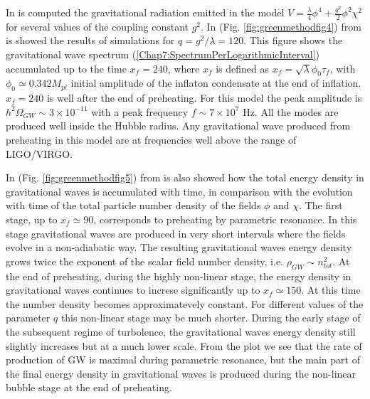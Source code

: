 \documentclass[11pt,a4paper,twoside]{book}
\begin{document}
In \cite{Chap7:GreenMethod} is computed the gravitational radiation emitted in the model $ V=\frac{\lambda}{4}\phi^{4}+\frac{g^{2}}{2}\phi^{2}\chi^{2} $ for several values of the coupling constant $ g^{2} $. In (Fig. \ref{fig:greenmethodfig4}) from \cite{Chap7:GreenMethod} is showed the results of simulations for $ q=g^{2}/\lambda=120 $. This figure shows the gravitational wave spectrum (\ref{Chap7:SpectrumPerLogarithmicInterval}) accumulated up to the time $ x_{f}= 240 $, where $ x_{f} $ is defined as $ x_{f}=\sqrt{\lambda}\phi_{0}\tau_{f} $, with $\phi_{0} \simeq 0.342 M_{pl}$ initial amplitude of the inflaton condensate at the end of inflation. $ x_{f}=240 $ is well after the end of preheating. For this model the peak amplitude is $ h^{2}\Omega_{GW} \sim 3 \times 10^{-11} $ with a peak frequency $ f \sim 7 \times 10^{7} $ Hz. All the modes are produced well inside the Hubble radius. Any gravitational wave produced from preheating in this model are at frequencies well above the range of LIGO/VIRGO.

In (Fig. \ref{fig:greenmethodfig5}) from \cite{Chap7:GreenMethod} is also showed how the total energy density in gravitational waves is accumulated with time, in comparison with the evolution with time of the total particle number density of the fields $\phi$ and $\chi$. The first stage, up to $ x_{f}\simeq 90 $, corresponds  to preheating by parametric resonance. In this stage gravitational waves are produced in very short intervals where the fields evolve in a non-adiabatic way. The resulting gravitational waves energy density grows twice the exponent  of the scalar field number density, i.e. $ \rho_{GW} \sim n_{tot}^{2} $. At the end of preheating, during the highly non-linear stage, the energy density in gravitational waves continues to increse significantly up to $ x_{f}\simeq 150 $. At this time the number density becomes approximatevely constant. For different values of the parameter $ q $ this non-linear stage may be much shorter. During the early stage of the subsequent  regime of turbolence, the gravitational waves energy density still slightly increases but at a much lower scale. From the plot we see that the rate of production of GW is maximal during parametric resonance, but the main part of the final energy density in gravitational waves is produced during the non-linear bubble stage at the end of preheating.
\end{document}
